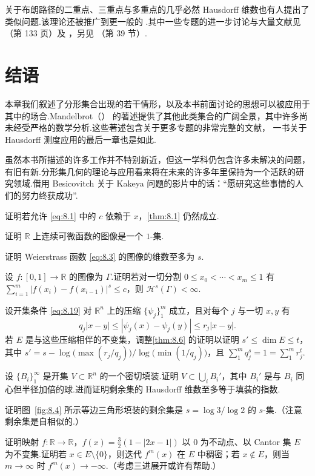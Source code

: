 关于布朗路径的二重点、三重点与多重点的几乎必然 Hausdorff 维数也有人提出了类似问题.该理论还被推广到更一般的 .其中一些专题的进一步讨论与大量文献见 \textcite{rogers1970}（第 133 页）及 \textcites{pruitttaylor1969,taylor1973,pruitt1975,adler1981}，另见 \textcite{mandelbrot1982}（第 39 节）.

\section{结语}

本章我们叙述了分形集合出现的若干情形，以及本书前面讨论的思想可以被应用于其中的场合.Mandelbrot（\citeyear{mandelbrot1975,mandelbrot1977,mandelbrot1982}） 的著述提供了其他此类集合的广阔全景，其中许多尚未经受严格的数学分析.这些著述包含关于更多专题的非常完整的文献，\textcite{rogers1970} 一书关于 Hausdorff 测度应用的最后一章也是如此.

虽然本书所描述的许多工作并不特别新近，但这一学科仍包含许多未解决的问题，有旧有新.分形集几何的理论与应用看来将在未来的许多年里保持为一个活跃的研究领域.借用 Besicovitch 关于 Kakeya 问题的影片中的话：``愿研究这些事情的人们的努力终获成功''.

\begin{exercises}
\item 证明若允许 \eqref{eq:8.1} 中的 $c$ 依赖于 $x$，\cref{thm:8.1} 仍然成立.
\item 证明 $\mathbb{R}$ 上连续可微函数的图像是一个 $1$-集.
\item 证明 Weierstrass 函数 \eqref{eq:8.3} 的图像的维数至多为 $s$.
\item 设 $f:[0,1]\to\mathbb{R}$ 的图像为 $\Gamma$.证明若对一切分割 $0\leq x_0<\cdots<x_m\leq 1$ 有 $\sum_{i=1}^{m}|f(x_i)-f(x_{i-1})|^s\leq c$，则 $\mathcal{H}^s(\Gamma)<\infty$.
\item 设开集条件 \eqref{eq:8.19} 对 $\mathbb{R}^n$ 上的压缩 $\{\psi_j\}_{1}^{m}$ 成立，且对每个 $j$ 与一切 $x,y$ 有
\[
  q_j|x-y|\leq|\psi_j(x)-\psi_j(y)|\leq r_j|x-y|.
\]
若 $E$ 是与这些压缩相伴的不变集，调整\cref{thm:8.6} 的证明以证明 $s'\leq\dim E\leq t$，其中 $s'=s-\log\bigl(\max(r_j/q_j)\bigr)/\log\bigl(\min(1/q_j)\bigr)$，且 $\sum_{1}^{m}q_j^{s}=1=\sum_{1}^{m}r_j^{t}$.
\item 设 $\{B_i\}_{1}^{\infty}$ 是开集 $V\subset\mathbb{R}^n$ 的一个密切填装.证明 $V\subset\bigcup_i B_i'$，其中 $B_i'$ 是与 $B_i$ 同心但半径加倍的球.进而证明剩余集的 Hausdorff 维数至多等于填装的指数.
\item 证明图~\ref{fig:8.4} 所示等边三角形填装的剩余集是 $s=\log 3/\log 2$ 的 $s$-集.（注意剩余集是自相似的.）
\item 证明映射 $f:\mathbb{R}\to\mathbb{R}$，$f(x)=\frac{3}{2}(1-|2x-1|)$ 以 $0$ 为不动点、以 Cantor 集 $E$ 为不变集.证明若 $x\in E\setminus\{0\}$，则迭代 $f^m(x)$ 在 $E$ 中稠密；若 $x\notin E$，则当 $m\to\infty$ 时 $f^m(x)\to-\infty$.（考虑三进展开或许有帮助.）
\end{exercises}
